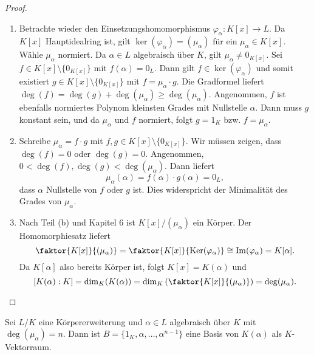 \begin{proof}
	\begin{enumerate}[label=(\alph*)]
		\item Betrachte wieder den Einsetzungshomomorphismus $\varphi_\alpha \colon K[x] \to L$. Da $K[x]$ Hauptidealring ist, gilt $\ker(\varphi_\alpha) = (\mu_\alpha)$ für ein $\mu_\alpha \in K[x]$. Wähle $\mu_\alpha$ normiert. Da $\alpha \in L$ algebraisch über $K$, gilt $\mu_\alpha \neq 0_{K[x]}$. Sei $f \in K[x] \setminus \{0_{K[x]}\}$ mit $f(\alpha) = 0_L$. Dann gilt $f \in \ker(\varphi_\alpha)$ und somit existiert $g \in K[x] \setminus \{0_{K[x]}\}$ mit $f = \mu_\alpha \cdot g$. Die Gradformel liefert $\deg(f) = \deg(g) + \deg(\mu_\alpha) \geq \deg(\mu_\alpha)$. Angenommen, $f$ ist ebenfalls normiertes Polynom kleinsten Grades mit Nullstelle $\alpha$. Dann muss $g$ konstant sein, und da $\mu_\alpha$ und $f$ normiert, folgt $g = 1_K$ bzw. $f = \mu_\alpha$.
		\item Schreibe $\mu_\alpha = f \cdot g$ mit $f,g \in K[x] \setminus \{0_{K[x]}\}$. Wir müssen zeigen, dass $\deg(f) = 0$ oder $\deg(g) = 0$. Angenommen, $ 0 < \deg(f),\deg(g) < \deg(\mu_\alpha)$. Dann liefert 
		\[\mu_\alpha (\alpha) = f(\alpha) \cdot g(\alpha) = 0_L,\]
		dass $\alpha$ Nullstelle von $f$ oder $g$ ist. Dies widerspricht der Minimalität des Grades von $\mu_\alpha$.
		
		\item Nach Teil (b) und Kapitel 6 ist $K[x] / (\mu_\alpha)$ ein Körper. Der Homomorphiesatz liefert
		\[\faktor{K[x]}{(\mu_\alpha)} = \faktor{K[x]}{\ker(\varphi_\alpha)} \cong \im(\varphi_\alpha) = K[\alpha].\]
		Da $K[\alpha]$ also bereits Körper ist, folgt $K[x] = K(\alpha)$ und 
		\[[K(\alpha) : K] = \dim_K(K(\alpha)) = \dim_K\left(\faktor{K[x]}{(\mu_\alpha)}\right) = \deg(\mu_\alpha).\]
	\end{enumerate}
\end{proof}
\begin{kor}\label{kor7_14}
	Sei $L/K$ eine Körpererweiterung und $\alpha \in L$ algebraisch über $K$ mit $\deg(\mu_\alpha) = n$. Dann ist $B = \{1_K, \alpha, \dots, \alpha^{n-1}\}$ eine Basis von $K(\alpha)$ als $K$-Vektorraum.
\end{kor}
